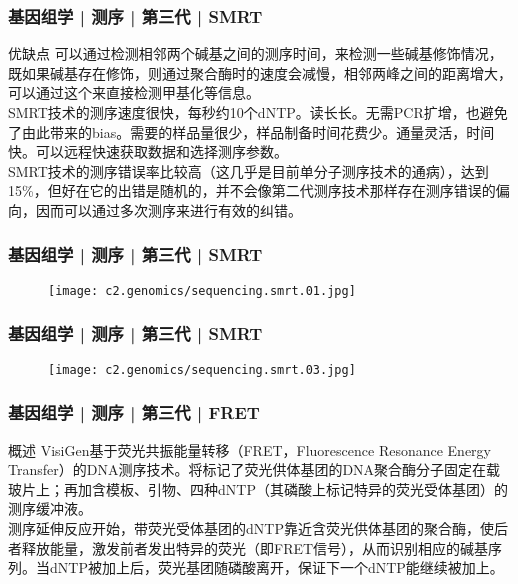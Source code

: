 \begin{frame}
  \frametitle{基因组学 | 测序 | 第三代 | SMRT}
  \begin{block}{优缺点}
可以通过检测相邻两个碱基之间的测序时间，来检测一些碱基修饰情况，既如果碱基存在修饰，则通过聚合酶时的速度会减慢，相邻两峰之间的距离增大，可以通过这个来直接检测甲基化等信息。\\
\vspace{1em}
SMRT技术的测序速度很快，每秒约10个dNTP。读长长。无需PCR扩增，也避免了由此带来的bias。需要的样品量很少，样品制备时间花费少。通量灵活，时间快。可以远程快速获取数据和选择测序参数。\\
\vspace{1em}
SMRT技术的测序错误率比较高（这几乎是目前单分子测序技术的通病），达到15\%，但好在它的出错是随机的，并不会像第二代测序技术那样存在测序错误的偏向，因而可以通过多次测序来进行有效的纠错。
  \end{block}
\end{frame}

\begin{frame}
  \frametitle{基因组学 | 测序 | 第三代 | SMRT}
  \begin{figure}
    \centering
    \texttt{[image: c2.genomics/sequencing.smrt.01.jpg]}
  \end{figure}
\end{frame}

\begin{frame}
  \frametitle{基因组学 | 测序 | 第三代 | SMRT}
  \begin{figure}
    \centering
    \texttt{[image: c2.genomics/sequencing.smrt.03.jpg]}
  \end{figure}
\end{frame}

\begin{frame}
  \frametitle{基因组学 | 测序 | 第三代 | FRET}
  \begin{block}{概述}
VisiGen基于荧光共振能量转移（FRET，Fluorescence Resonance Energy Transfer）的DNA测序技术。将标记了荧光供体基团的DNA聚合酶分子固定在载玻片上；再加含模板、引物、四种dNTP（其磷酸上标记特异的荧光受体基团）的测序缓冲液。\\
\vspace{1em}
测序延伸反应开始，带荧光受体基团的dNTP靠近含荧光供体基团的聚合酶，使后者释放能量，激发前者发出特异的荧光（即FRET信号），从而识别相应的碱基序列。当dNTP被加上后，荧光基团随磷酸离开，保证下一个dNTP能继续被加上。
  \end{block}
\end{frame}

